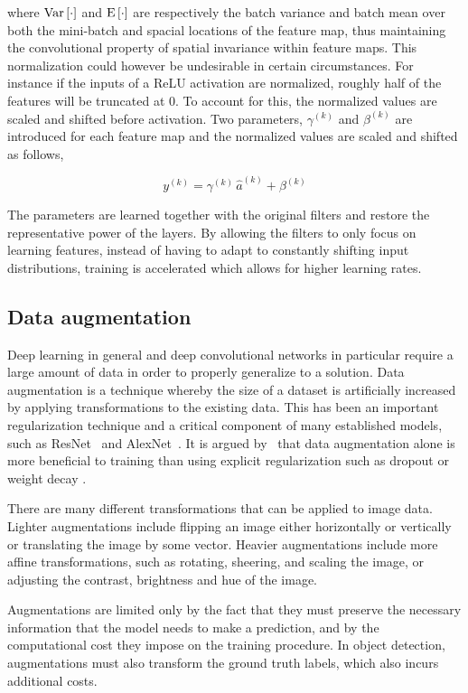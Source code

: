 where \(\text{Var}\left[\cdot\right]\) and \(\text{E}\left[\cdot\right]\) are respectively the batch variance and batch mean over both the mini-batch and spacial locations of the feature map, thus maintaining the convolutional property of spatial invariance within feature maps.
This normalization could however be undesirable in certain circumstances.
For instance if the inputs of a ReLU activation are normalized, roughly half of the features will be truncated at 0.
To account for this, the normalized values are scaled and shifted before activation.
Two parameters, \(\gamma^{(k)}\) and \(\beta^{(k)}\) are introduced for each feature map and the normalized values are scaled and shifted as follows,

\begin{equation*}
  y^{(k)}=\gamma^{(k)}\,\widehat{a}^{(k)}+\beta^{(k)}
\end{equation*}

The parameters are learned together with the original filters and restore the representative power of the layers.
By allowing the filters to only focus on learning features, instead of having to adapt to constantly shifting input distributions, training is accelerated which allows for higher learning rates.

\subsection{Data augmentation}
Deep learning in general and deep convolutional networks in particular require a large amount of data in order to properly generalize to a solution.
Data augmentation is a technique whereby the size of a dataset is artificially increased by applying transformations to the existing data.
This has been an important regularization technique and a critical component of many established models, such as ResNet\ \parencite{he2015deep} and AlexNet\ \parencite{alexnet}.
It is argued by\ \citeauthor{Hern_ndez_Garc_a_2018} that data augmentation alone is more beneficial to training than using explicit regularization such as dropout or weight decay \parencite{Hern_ndez_Garc_a_2018}.

There are many different transformations that can be applied to image data. Lighter augmentations include flipping an image either horizontally or vertically or translating the image by some vector. Heavier augmentations include more affine transformations, such as rotating, sheering, and scaling the image, or adjusting the contrast, brightness and hue of the image.

Augmentations are limited only by the fact that they must preserve the necessary information that the model needs to make a prediction, and by the computational cost they impose on the training procedure. In object detection, augmentations must also transform the ground truth labels, which also incurs additional costs.

